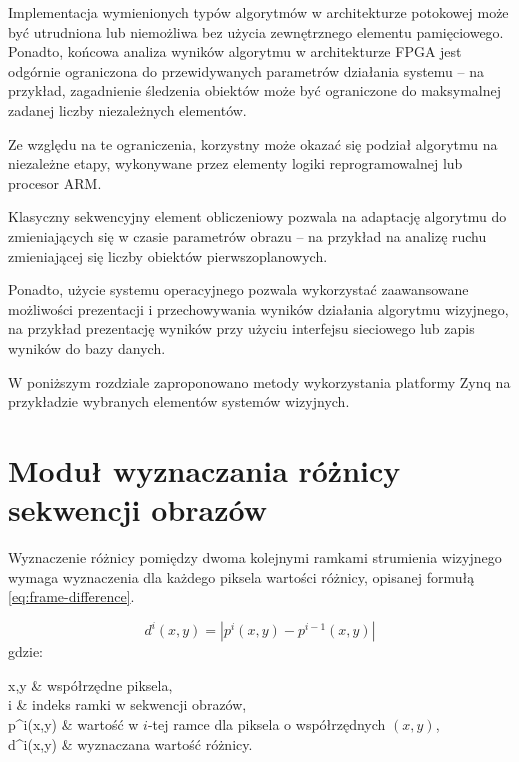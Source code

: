 Implementacja wymienionych typów algorytmów w architekturze potokowej może być utrudniona lub niemożliwa bez użycia zewnętrznego elementu pamięciowego. %
Ponadto, końcowa analiza wyników algorytmu w architekturze FPGA jest odgórnie ograniczona do przewidywanych parametrów działania systemu -- na przykład, zagadnienie śledzenia obiektów może być ograniczone do maksymalnej zadanej liczby niezależnych elementów. %

Ze względu na te ograniczenia, korzystny może okazać się podział algorytmu na niezależne etapy, wykonywane przez elementy logiki reprogramowalnej lub procesor ARM.  %

Klasyczny sekwencyjny element obliczeniowy pozwala na adaptację algorytmu do zmieniających się w czasie parametrów obrazu -- na przykład na analizę ruchu zmieniającej się liczby obiektów pierwszoplanowych. %

Ponadto, użycie systemu operacyjnego pozwala wykorzystać zaawansowane możliwości prezentacji i przechowywania wyników działania algorytmu wizyjnego, na przykład prezentację wyników przy użyciu interfejsu sieciowego lub zapis wyników do bazy danych. %

W poniższym rozdziale zaproponowano metody wykorzystania platformy Zynq na przykładzie wybranych elementów systemów wizyjnych.


\section{Moduł wyznaczania różnicy sekwencji obrazów} %

Wyznaczenie różnicy pomiędzy dwoma kolejnymi ramkami strumienia wizyjnego wymaga wyznaczenia dla każdego piksela wartości różnicy, opisanej formułą \eqref{eq:frame-difference}. %

\begin{equation}
\label{eq:frame-difference}
d^i(x,y) = | p^i(x,y) - p^{i-1}(x,y) |
\end{equation}
gdzie:
\begin{conditions}
	x,y & współrzędne piksela, \\
	i & indeks ramki w sekwencji obrazów, \\
	p^i(x,y) & wartość w $i$-tej ramce dla piksela o współrzędnych $(x,y)$, \\
	d^i(x,y) & wyznaczana wartość różnicy. \\
\end{conditions}

